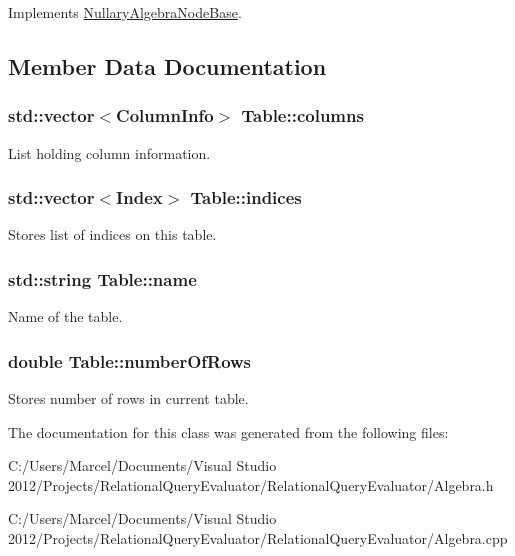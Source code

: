Implements \hyperlink{class_nullary_algebra_node_base_a48446f68e1ddfc2357dcd048fd82ba80}{Nullary\+Algebra\+Node\+Base}.



\subsection{Member Data Documentation}
\hypertarget{class_table_ad6e2d1b269aa5c182e0357b75f46eee0}{
\subsubsection[{columns}]{\setlength{\rightskip}{0pt plus 5cm}std\+::vector$<${\bf Column\+Info}$>$ Table\+::columns}}\label{class_table_ad6e2d1b269aa5c182e0357b75f46eee0}
List holding column information. \hypertarget{class_table_a985077d6ec6eacb7828b78b9b9bc6157}{
\subsubsection[{indices}]{\setlength{\rightskip}{0pt plus 5cm}std\+::vector$<${\bf Index}$>$ Table\+::indices}}\label{class_table_a985077d6ec6eacb7828b78b9b9bc6157}
Stores list of indices on this table. \hypertarget{class_table_a776e2cab59507b3b59d475a964e347b8}{
\subsubsection[{name}]{\setlength{\rightskip}{0pt plus 5cm}std\+::string Table\+::name}}\label{class_table_a776e2cab59507b3b59d475a964e347b8}
Name of the table. \hypertarget{class_table_ae85736953b357d0d44a50fd4a47de796}{
\subsubsection[{number\+Of\+Rows}]{\setlength{\rightskip}{0pt plus 5cm}double Table\+::number\+Of\+Rows}}\label{class_table_ae85736953b357d0d44a50fd4a47de796}
Stores number of rows in current table. 

The documentation for this class was generated from the following files\+:\begin{DoxyCompactItemize}
\item 
C\+:/\+Users/\+Marcel/\+Documents/\+Visual Studio 2012/\+Projects/\+Relational\+Query\+Evaluator/\+Relational\+Query\+Evaluator/Algebra.\+h\item 
C\+:/\+Users/\+Marcel/\+Documents/\+Visual Studio 2012/\+Projects/\+Relational\+Query\+Evaluator/\+Relational\+Query\+Evaluator/Algebra.\+cpp\end{DoxyCompactItemize}
